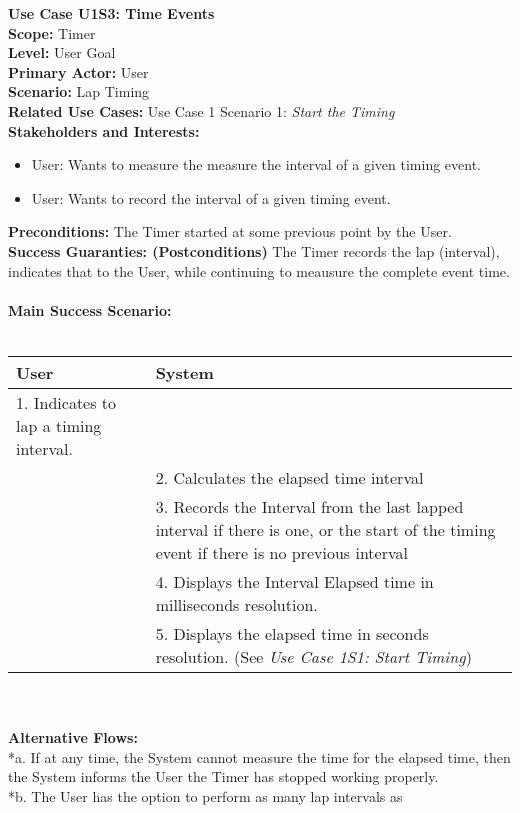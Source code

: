 \documentclass[letterpaper]{article}
\begin{document}
\noindent
\textbf{Use Case U1S3:  Time Events}\\
\textbf{Scope:  }Timer\\
\textbf{Level:  }User Goal\\
\textbf{Primary Actor:  }User\\
\textbf{Scenario:  }Lap Timing\\
\textbf{Related Use Cases:  }Use Case 1 Scenario 1:
\textit{Start the Timing}\\
\textbf{Stakeholders and Interests:}
\begin{itemize}
\item User:  Wants to measure the measure the interval of a given
timing event.
\item User:  Wants to record the interval of a given timing event.
\end{itemize}
\textbf{Preconditions:  }The Timer started at some previous
point by the User.\\
\textbf{Success Guaranties:  (Postconditions)} 
The Timer records the lap (interval), indicates that to the User,
while continuing to meausure the complete event time.\\\\
\textbf{Main Success Scenario: }\\\\
\begin{tabular}{|p{6cm}|p{6cm}|}\hline
\textbf{User} & \textbf{System}\\\hline
1.  Indicates to lap a timing interval. & \\\hline
&2.  Calculates the elapsed time interval\\\hline
&3.  Records the Interval from the last lapped interval if there
is one, or the start of the timing event if there is no previous
interval\\\hline
&4.  Displays the Interval Elapsed time in milliseconds
resolution.\\\hline
&5.  Displays the elapsed time in seconds resolution. (See
\textit{Use Case 1S1: Start Timing})\\\hline
\end{tabular}\\\\
\textbf{Alternative Flows:  }\\
*a.  If at any time, the System cannot measure the time for the
elapsed time, then the System informs the User the Timer has
stopped working properly.\\
*b.  The User has the option to perform as many lap intervals as
\end{document}
